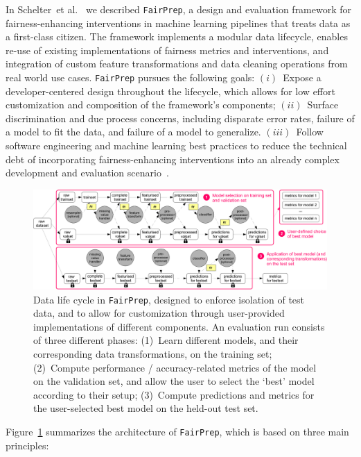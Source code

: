 \documentclass[11pt]{article}
\newcommand{\etal}{et al.\xspace}
\newcommand{\fairprep}{\stt{FairPrep}\xspace}
\newcommand{\stt}[1]{{\footnotesize\texttt{#1}}}
\begin{document}
In Schelter~\etal~\cite{DBLP:conf/edbt/SchelterHKS20} we described \fairprep, a design and evaluation framework for fairness-enhancing interventions in machine learning pipelines that treats data as a first-class citizen.  The framework implements a modular data lifecycle, enables re-use of existing implementations of fairness metrics and interventions, and integration of custom feature transformations and data cleaning operations from real world use cases. \fairprep pursues the following goals: $(i)$~Expose a developer-centered design throughout the lifecycle, which allows for low effort customization and composition of the framework's components; $(ii)$~Surface discrimination and due process concerns, including disparate error rates, failure of a model to fit the data, and failure of a model to generalize. $(iii)$~Follow software engineering and machine learning best practices to reduce the technical debt of incorporating fairness-enhancing interventions into an already complex development and evaluation scenario~\cite{Schelter2018c,Sculley2015}.  


\begin{figure}[t!]
  \centering
  \includegraphics[scale=0.5]{figs/bigpicture-crop}  
  \caption{Data life cycle in \fairprep, designed to enforce isolation of  test data, and to allow for customization through user-provided implementations of different components. An evaluation run consists of three different phases: (1)~Learn different models, and their corresponding data transformations, on the training set; (2)~Compute performance / accuracy-related metrics of the model on the validation set, and allow the user to select the `best' model according to their setup; (3)~Compute predictions and metrics for the user-selected best model on the held-out test set.}
  \label{fig:bigpicture}
\end{figure}

Figure~\ref{fig:bigpicture} summarizes the architecture of \fairprep, which is based on three main principles: 
\end{document}
